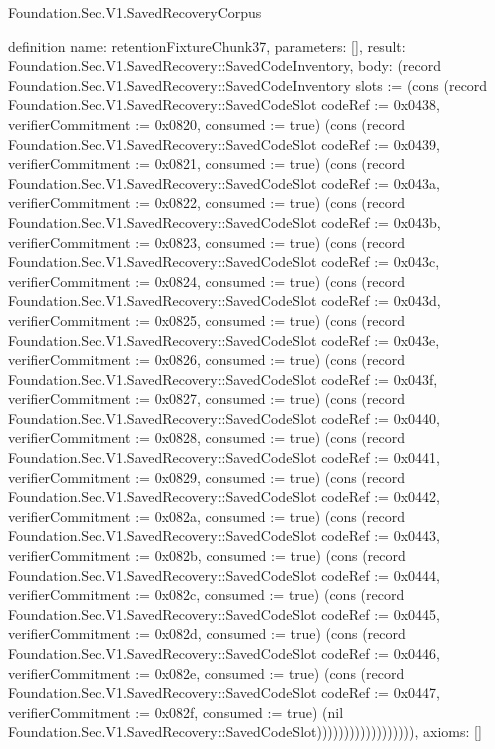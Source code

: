 \begin{lexlean}{Foundation.Sec.V1.SavedRecoveryCorpus}
\begin{semanticmodule}
definition{
  name: retentionFixtureChunk37,
  parameters: [],
  result: Foundation.Sec.V1.SavedRecovery::SavedCodeInventory,
  body: (record Foundation.Sec.V1.SavedRecovery::SavedCodeInventory {slots := (cons (record Foundation.Sec.V1.SavedRecovery::SavedCodeSlot {codeRef := 0x0438, verifierCommitment := 0x0820, consumed := true}) (cons (record Foundation.Sec.V1.SavedRecovery::SavedCodeSlot {codeRef := 0x0439, verifierCommitment := 0x0821, consumed := true}) (cons (record Foundation.Sec.V1.SavedRecovery::SavedCodeSlot {codeRef := 0x043a, verifierCommitment := 0x0822, consumed := true}) (cons (record Foundation.Sec.V1.SavedRecovery::SavedCodeSlot {codeRef := 0x043b, verifierCommitment := 0x0823, consumed := true}) (cons (record Foundation.Sec.V1.SavedRecovery::SavedCodeSlot {codeRef := 0x043c, verifierCommitment := 0x0824, consumed := true}) (cons (record Foundation.Sec.V1.SavedRecovery::SavedCodeSlot {codeRef := 0x043d, verifierCommitment := 0x0825, consumed := true}) (cons (record Foundation.Sec.V1.SavedRecovery::SavedCodeSlot {codeRef := 0x043e, verifierCommitment := 0x0826, consumed := true}) (cons (record Foundation.Sec.V1.SavedRecovery::SavedCodeSlot {codeRef := 0x043f, verifierCommitment := 0x0827, consumed := true}) (cons (record Foundation.Sec.V1.SavedRecovery::SavedCodeSlot {codeRef := 0x0440, verifierCommitment := 0x0828, consumed := true}) (cons (record Foundation.Sec.V1.SavedRecovery::SavedCodeSlot {codeRef := 0x0441, verifierCommitment := 0x0829, consumed := true}) (cons (record Foundation.Sec.V1.SavedRecovery::SavedCodeSlot {codeRef := 0x0442, verifierCommitment := 0x082a, consumed := true}) (cons (record Foundation.Sec.V1.SavedRecovery::SavedCodeSlot {codeRef := 0x0443, verifierCommitment := 0x082b, consumed := true}) (cons (record Foundation.Sec.V1.SavedRecovery::SavedCodeSlot {codeRef := 0x0444, verifierCommitment := 0x082c, consumed := true}) (cons (record Foundation.Sec.V1.SavedRecovery::SavedCodeSlot {codeRef := 0x0445, verifierCommitment := 0x082d, consumed := true}) (cons (record Foundation.Sec.V1.SavedRecovery::SavedCodeSlot {codeRef := 0x0446, verifierCommitment := 0x082e, consumed := true}) (cons (record Foundation.Sec.V1.SavedRecovery::SavedCodeSlot {codeRef := 0x0447, verifierCommitment := 0x082f, consumed := true}) (nil Foundation.Sec.V1.SavedRecovery::SavedCodeSlot)))))))))))))))))}),
  axioms: []
}


\end{semanticmodule}
\end{lexlean}
